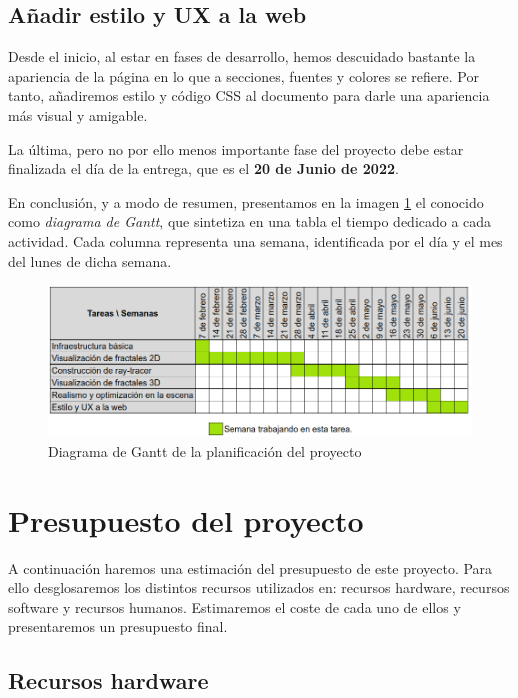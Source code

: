 \subsection*{Añadir estilo y UX a la web}

Desde el inicio, al estar en fases de desarrollo, hemos descuidado bastante la apariencia de la página en lo que a secciones, fuentes y colores se refiere. Por tanto, añadiremos estilo y código CSS al documento para darle una apariencia más visual y amigable.

La última, pero no por ello menos importante fase del proyecto debe estar finalizada el día de la entrega, que es el \textbf{20 de Junio de 2022}.

\vspace{0.5cm}

En conclusión, y a modo de resumen, presentamos en la imagen \ref{fig:Gantt} el conocido como \textit{diagrama de Gantt}, que sintetiza en una tabla el tiempo dedicado a cada actividad. Cada columna representa una semana, identificada por el día y el mes del lunes de dicha semana.

\begin{figure} [ht]
    \centering
    \includegraphics[scale = 0.44]{img/Gantt.png}
    \caption{Diagrama de Gantt de la planificación del proyecto}
    \label{fig:Gantt}
\end{figure}


\section*{Presupuesto del proyecto}

A continuación haremos una estimación del presupuesto de este proyecto. Para ello desglosaremos los distintos recursos utilizados en: recursos hardware, recursos software y recursos humanos. Estimaremos el coste de cada uno de ellos y presentaremos un presupuesto final.

\subsection*{Recursos hardware}

